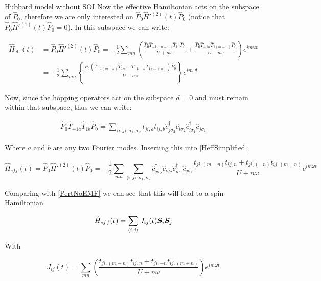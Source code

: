\begin{section}{Hubbard model without SOI}
Now the effective Hamiltonian acts on the subspace of $\hat{P}_0$, therefore we are only interested on $\hat{P}_0 \hat{H}'^{(2)}(t) \hat{P}_0$ (notice that $\hat{P}_0 \hat{H}'^{(1)}(t) \hat{P}_0 = 0$). In this subspace we can write:

\begin{align}
\hat{H}_{\text{eff}}(t) &= \hat{P}_0\hat{H}'^{(2)}(t)\hat{P}_0 = -\frac{1}{2}\sum_{mn} \left( \frac{\hat{P}_0  \hat{T}_{-1(m-n)}\hat{T}_{1n}\hat{P}_0}{U+n\omega} + \frac{\hat{P}_0 \hat{T}_{-1n} \hat{T}_{1(m-n)} \hat{P}_0}{U-n\omega} \right) e^{im\omega t} \nonumber \\
&= -\frac{1}{2}\sum_{mn} \left\{ \frac{\hat{P}_0  (\hat{T}_{-1(m-n)}\hat{T}_{1n} + \hat{T}_{-1-n}\hat{T}_{1(m+n)})\hat{P}_0}{U+n\omega} \right\} e^{im\omega t} \label{HeffSimplified}
\end{align}

Now, since the hopping operators act on the subspace $d=0$ and must remain within that subspace, thus we can write:

\begin{align*}
\hat{P}_0 \hat{T}_{-1a} \hat{T}_{1b} \hat{P}_0 = \sum_{\langle i,j \rangle, \sigma_1, \sigma_2} t_{ji,a} t_{ij,b} \hat{c}_{j \sigma_2}^\dagger \hat{c}_{i \sigma_2} \hat{c}_{i \sigma_1}^\dagger \hat{c}_{j \sigma_1}
\end{align*}

Where $a$ and $b$ are any two Fourier modes. Inserting this into \ref{HeffSimplified}:

\begin{equation}
\hat{H}_{eff}(t) = \hat{P}_0\hat{H}'^{(2)}(t)\hat{P}_0 = - \frac{1}{2}\sum_{mn} \sum_{\langle i,j \rangle, \sigma_1, \sigma_2}\hat{c}_{j \sigma_2}^\dagger \hat{c}_{i \sigma_2} \hat{c}_{i \sigma_1}^\dagger \hat{c}_{j \sigma_1} \frac{t_{ji,(m-n)} t_{ij,n} + t_{ji,(-n)} t_{ij,(m+n)}}{U+n\omega} e^{im\omega t}
\end{equation}

Comparing with \ref{PertNoEMF} we can see that this will lead to a spin Hamiltonian 

\begin{equation}
\hat{H}_{eff}(t) = \sum_{\langle i,j \rangle} J_{ij}(t) \boldsymbol{S}_i \boldsymbol{S}_j
\end{equation}

With 

\begin{equation}
J_{ij}(t) = \sum_{mn} \left( \frac{t_{ji,(m-n)} t_{ij,n} + t_{ji,-n} t_{ij,(m+n)}}{U+n\omega} \right) e^{im\omega t} \label{Jij1}
\end{equation}


\end{section}
